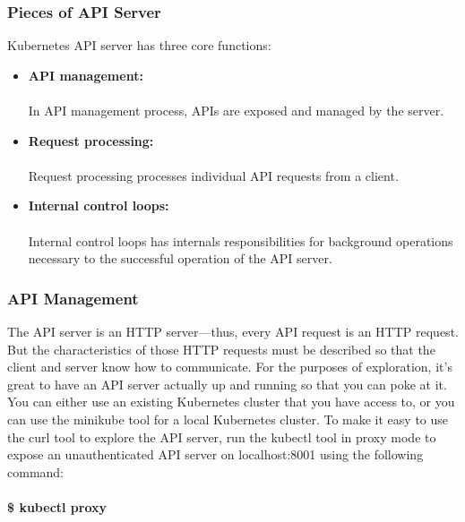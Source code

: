 \documentclass[12pt]{article}
\begin{document}
\subsubsection{Pieces of API Server}
Kubernetes API server has three core functions:
\begin{itemize}
	\item \textbf{API management:}\\\\
	In API management process, APIs are exposed and managed by the server.
	\item \textbf{Request processing:}\\\\
	Request processing processes individual API requests from a client.
	\item \textbf{Internal control loops:}\\\\
	Internal control loops has internals responsibilities for background operations necessary to the successful operation of the API server.
\end{itemize}
\subsubsection{API Management \cite{KubernetesManagement}}
The API server is an HTTP server—thus, every API request is an HTTP request. But the characteristics of those HTTP requests must be described so that the client and server know how to communicate. For the purposes of exploration, it’s great to have an API server actually up and running so that you can poke at it. You can either use an existing Kubernetes cluster that you have access to, or you can use the minikube tool for a local Kubernetes cluster. To make it easy to use the curl tool to explore the API server, run the kubectl tool in proxy mode to expose an unauthenticated API server on localhost:8001 using the following command:\\\\
\textbf{\$ kubectl proxy}
\end{document}

